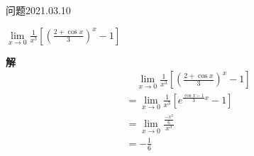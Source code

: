 \begin{mybox}{问题2021.03.10}
	
	\qquad $\lim\limits_{x \to 0}\frac{1}{x^3}[(\frac{2+\cos x}{3})^x-1]$
\end{mybox}
\noindent
\textbf{解}
\begin{align*}
	&\quad \lim\limits_{x \to 0}\frac{1}{x^3}[(\frac{2+\cos x}{3})^x-1]\\
	&=\lim\limits_{x \to 0}\frac{1}{x^3}[e^{\frac{\cos x-1}{3}x}-1]\\
	&=\lim\limits_{x \to 0} \frac{\frac{-x^3}{6}}{x^3}\\
	&=-\frac{1}{6}
\end{align*}